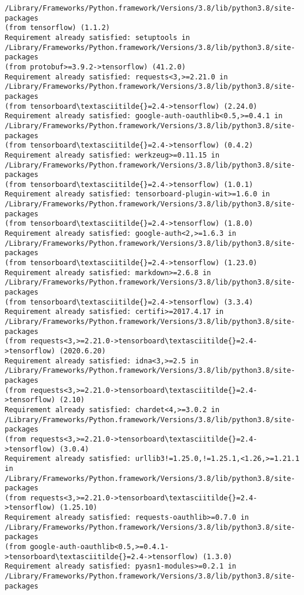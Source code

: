 \documentclass[11pt]{article}
\begin{document}
\begin{Verbatim}[commandchars=\\\{\}]
/Library/Frameworks/Python.framework/Versions/3.8/lib/python3.8/site-packages
(from tensorflow) (1.1.2)
Requirement already satisfied: setuptools in
/Library/Frameworks/Python.framework/Versions/3.8/lib/python3.8/site-packages
(from protobuf>=3.9.2->tensorflow) (41.2.0)
Requirement already satisfied: requests<3,>=2.21.0 in
/Library/Frameworks/Python.framework/Versions/3.8/lib/python3.8/site-packages
(from tensorboard\textasciitilde{}=2.4->tensorflow) (2.24.0)
Requirement already satisfied: google-auth-oauthlib<0.5,>=0.4.1 in
/Library/Frameworks/Python.framework/Versions/3.8/lib/python3.8/site-packages
(from tensorboard\textasciitilde{}=2.4->tensorflow) (0.4.2)
Requirement already satisfied: werkzeug>=0.11.15 in
/Library/Frameworks/Python.framework/Versions/3.8/lib/python3.8/site-packages
(from tensorboard\textasciitilde{}=2.4->tensorflow) (1.0.1)
Requirement already satisfied: tensorboard-plugin-wit>=1.6.0 in
/Library/Frameworks/Python.framework/Versions/3.8/lib/python3.8/site-packages
(from tensorboard\textasciitilde{}=2.4->tensorflow) (1.8.0)
Requirement already satisfied: google-auth<2,>=1.6.3 in
/Library/Frameworks/Python.framework/Versions/3.8/lib/python3.8/site-packages
(from tensorboard\textasciitilde{}=2.4->tensorflow) (1.23.0)
Requirement already satisfied: markdown>=2.6.8 in
/Library/Frameworks/Python.framework/Versions/3.8/lib/python3.8/site-packages
(from tensorboard\textasciitilde{}=2.4->tensorflow) (3.3.4)
Requirement already satisfied: certifi>=2017.4.17 in
/Library/Frameworks/Python.framework/Versions/3.8/lib/python3.8/site-packages
(from requests<3,>=2.21.0->tensorboard\textasciitilde{}=2.4->tensorflow) (2020.6.20)
Requirement already satisfied: idna<3,>=2.5 in
/Library/Frameworks/Python.framework/Versions/3.8/lib/python3.8/site-packages
(from requests<3,>=2.21.0->tensorboard\textasciitilde{}=2.4->tensorflow) (2.10)
Requirement already satisfied: chardet<4,>=3.0.2 in
/Library/Frameworks/Python.framework/Versions/3.8/lib/python3.8/site-packages
(from requests<3,>=2.21.0->tensorboard\textasciitilde{}=2.4->tensorflow) (3.0.4)
Requirement already satisfied: urllib3!=1.25.0,!=1.25.1,<1.26,>=1.21.1 in
/Library/Frameworks/Python.framework/Versions/3.8/lib/python3.8/site-packages
(from requests<3,>=2.21.0->tensorboard\textasciitilde{}=2.4->tensorflow) (1.25.10)
Requirement already satisfied: requests-oauthlib>=0.7.0 in
/Library/Frameworks/Python.framework/Versions/3.8/lib/python3.8/site-packages
(from google-auth-oauthlib<0.5,>=0.4.1->tensorboard\textasciitilde{}=2.4->tensorflow) (1.3.0)
Requirement already satisfied: pyasn1-modules>=0.2.1 in
/Library/Frameworks/Python.framework/Versions/3.8/lib/python3.8/site-packages

\end{Verbatim}
\end{document}
